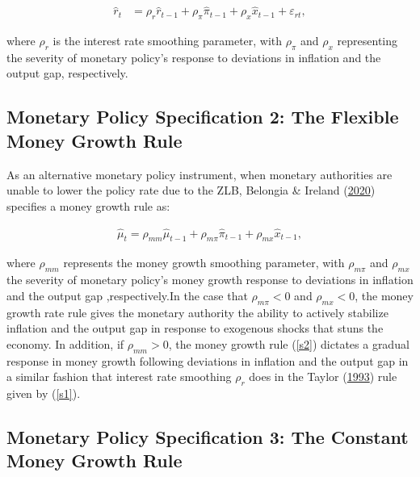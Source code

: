 \documentclass[11pt,preprint, authoryear]{elsarticle}
\numberwithin{equation}{section}
\numberwithin{figure}{section}
\numberwithin{table}{section}
\begin{document}
\begin{align}
\hat{r}_t &= \rho_r  \hat{r}_{t-1} +\rho_\pi   \hat{\pi}_{t-1} + \rho_x   \hat{x}_{t-1} +  \varepsilon_{r t}, \label{s1}
\end{align}

where \(\rho_r\) is the interest rate smoothing parameter, with
\(\rho_\pi\) and \(\rho_x\) representing the severity of monetary
policy's response to deviations in inflation and the output gap,
respectively.

\hypertarget{monetary-policy-specification-2-the-flexible-money-growth-rule}{%
\subsection{Monetary Policy Specification 2: The Flexible Money Growth
Rule}\label{monetary-policy-specification-2-the-flexible-money-growth-rule}}

As an alternative monetary policy instrument, when monetary authorities
are unable to lower the policy rate due to the ZLB, Belongia \& Ireland
(\protect\hyperlink{ref-belongia2020}{2020}) specifies a money growth
rule as:

\begin{align}
\hat{\mu}_t = \rho_{mm} \hat{\mu}_{t-1} + \rho_{m \pi} \hat{\pi}_{t-1} +\rho_{mx} \hat{x}_{t-1}, \label{s2}
\end{align}

where \(\rho_{mm}\) represents the money growth smoothing parameter,
with \(\rho_{m \pi}\) and \(\rho_{mx}\) the severity of monetary
policy's money growth response to deviations in inflation and the output
gap ,respectively.In the case that \(\rho_{m \pi} <0\) and
\(\rho_{mx} <0\), the money growth rate rule gives the monetary
authority the ability to actively stabilize inflation and the output gap
in response to exogenous shocks that stuns the economy. In addition, if
\(\rho_{mm}>0\), the money growth rule (\ref{s2}) dictates a gradual
response in money growth following deviations in inflation and the
output gap in a similar fashion that interest rate smoothing \(\rho_r\)
does in the Taylor (\protect\hyperlink{ref-taylor1993}{1993}) rule given
by (\ref{s1}).

\hypertarget{monetary-policy-specification-3-the-constant-money-growth-rule}{%
\subsection{Monetary Policy Specification 3: The Constant Money Growth
Rule}\label{monetary-policy-specification-3-the-constant-money-growth-rule}}
\end{document}
